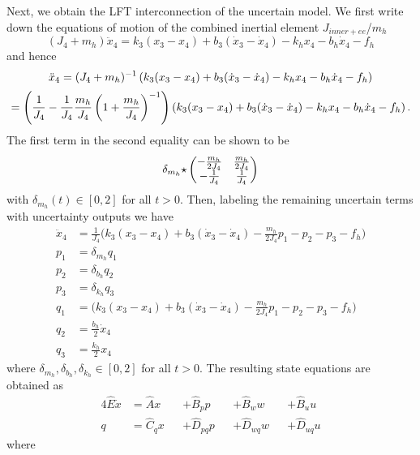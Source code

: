 Next, we obtain the LFT interconnection of the uncertain model. We first write down the equations of motion of the combined 
inertial element $J_{inner+ee}$/$m_h$
\[
(J_4+m_h)\ddot{x}_4 = k_3(x_3-x_4) + b_3(\dot{x}_3-\dot{x}_4) - k_hx_4 - b_h\dot{x}_4 -f_h
\]
and hence
\[%
\ddot{x}_4 = \inv{(J_4 + m_h)}\left(k_3(x_3-x_4) + b_3(\dot{x}_3-\dot{x}_4) - k_hx_4 - b_h\dot{x}_4 -f_h\right)
\]\[
           = {%
                            \left(\frac{1}{J_4} - \frac{1}{J_4}\frac{m_h}{J_4}\inv{\left(1+\frac{m_h}{J_4}\right)}\right)%
                            }%
        \left(k_3(x_3-x_4) + b_3(\dot{x}_3-\dot{x}_4) - k_hx_4 - b_h\dot{x}_4 -f_h\right).
\]%
The first term in the second equality can be shown to be 
\[
\delta_{m_h}{\displaystyle\star}\begin{pmatrix}-\frac{m_h}{2J_4}&\frac{m_h}{2J_4}\\-\frac{1}{J_4}&\frac{1}{J_4}\end{pmatrix}
\]
with $\delta_{m_h}(t)\in[0,2]$ for all $t>0$. Then, labeling the remaining uncertain terms with uncertainty outputs we have
\begin{align}
\ddot{x}_4 &= \frac{1}{J_4}\bigg(k_3(x_3-x_4) + b_3(\dot{x}_3-\dot{x}_4) - \frac{m_h}{2J_4}p_1 - p_2 - p_3 -f_h\bigg)\\
p_1 &= \delta_{m_h}q_1\\
p_2 &= \delta_{b_h}q_2\\
p_3 &= \delta_{k_h}q_3\\
q_1 &= \bigg(k_3(x_3-x_4) + b_3(\dot{x}_3-\dot{x}_4) - \frac{m_h}{2J_4}p_1 - p_2 - p_3 -f_h\bigg)\\
q_2 &= \frac{b_h}{2}\dot{x}_4\\
q_3 &= \frac{k_h}{2}x_4
\end{align}
where $\delta_{m_h},\delta_{b_h},\delta_{k_h}\in[0,2]$ for all $t>0$. The resulting state equations are obtained as
\begin{alignat}{4}\label{eq:prestateequations1}
\hat{E}\dot{x} &= \hat Ax   &&+ \hat B_p p   &&+ \hat B_w w   &&+ \hat B_u u\\\label{eq:prestateequations2}
q        &= \hat C_qx &&+ \hat D_{pq}p &&+ \hat D_{wq}w &&+ \hat D_{uq}u
\end{alignat}
where 
